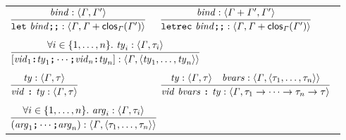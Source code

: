 \documentclass[final]{article}
\begin{document}
\begin{figure}[t]
\begin{small}
\begin{center}
  \begin{tabular}{llll}
    \multicolumn{2}{l}{
      $\MEMinferb
      {\MEMtyping{\CONSletdec{\METAbind}}{\METAityenv}{\MEMplusenv{\METAityenv}{\MEMclos{\METAityenv}{\METAityenv'}}}}
      {\MEMtyping{\METAbind}{\METAityenv}{\METAityenv'}}$
    }

    &

    \multicolumn{2}{l}{
      $\MEMinferb
      {\MEMtyping{\CONSletrecdec{\METAbind}}{\METAityenv}{\MEMplusenv{\METAityenv}{\MEMclos{\METAityenv}{\METAityenv'}}}}
      {\MEMtyping{\METAbind}{\MEMplusenv{\METAityenv}{\METAityenv'}}{\METAityenv'}}$
    }

    \\
    &&&
    \\

    \multicolumn{4}{l}{
      $\MEMinferb
      {\MEMtyping
        {\CONSbvarsn{\CONSonebvar{\METAvid_1}{\METAty_1}}{\CONSonebvar{\METAvid_n}{\METAty_n}}}
        {\METAityenv}
        {\mytuple{\METAty_1,\dots,\METAty_n}}
      }
      {\forallexp{i\in\{1,\dots,n\}}{\MEMtyping{\METAty_i}{\METAityenv}{\METAity_i}}}$
    }

    \\
    &&&
    \\

    \multicolumn{2}{l}{
      $\MEMinferb
      {\MEMtyping
        {\CONSonearg{\METAvid}{\METAty}}
        {\METAityenv}
        {\METAity}
      }
      {\MEMtyping{\METAty}{\METAityenv}{\METAity}}$
    }

    &

    \multicolumn{2}{l}{
      $\MEMinferc
      {\MEMtyping
        {\CONSoneargbvars{\METAvid}{\METAty}{\METAbvars}}
        {\METAityenv}
        {\CONSarrowty{\METAity_1}{\CONSarrowty{\cdots}{\CONSarrowty{\METAity_n}{\METAity}}}}
      }
      {\MEMtyping{\METAty}{\METAityenv}{\METAity}}
      {\MEMtyping{\METAbvars}{\METAityenv}{\mytuple{\METAity_1,\dots,\METAity_n}}}$
    }

    \\
    &&&
    \\

    \multicolumn{4}{l}{
      $\MEMinferb
      {\MEMtyping
        {\CONSargsn{\METAarg_1}{\METAarg_n}}
        {\METAityenv}
        {\mytuple{\METAity_1,\dots,\METAity_n}}
      }
      {\forallexp{i\in\{1,\dots,n\}}{\MEMtyping{\METAarg_i}{\METAityenv}{\METAity_i}}}$
    }


\end{tabular}
\end{center}
\end{small}
\end{figure}
\end{document}
